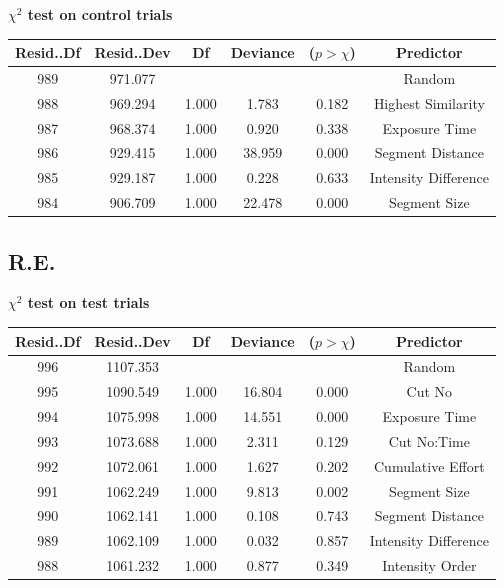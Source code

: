 \documentclass{article}
\begin{document}
\textbf{$\chi^2$ test on control trials}
\label{table:participantsAnovaMAEControl}
\begin{table}[ht]
    \centering
    \begin{tabular}{cccccc}
    \hline
    Resid..Df & Resid..Dev &    Df & Deviance & ($p > \chi$) &    Predictor \\
    \hline
        989 &    971.077 &       &          &            &   Random \\
      988 &    969.294 & 1.000 &    1.783 &      0.182 & Highest Similarity \\
      987 &    968.374 & 1.000 &    0.920 &      0.338 &          Exposure Time \\
      986 &    929.415 & 1.000 &   38.959 &      0.000 &          Segment Distance \\
      985 &    929.187 & 1.000 &    0.228 &      0.633 &         Intensity Difference \\
      984 &    906.709 & 1.000 &   22.478 &      0.000 &          Segment Size \\
    \hline
    \end{tabular}
\end{table}
\clearpage


\subsection*{R.E.}
\label{table:participantsAnovaRE}    
\textbf{$\chi^2$ test on test trials}
 
\begin{table}[ht]    
    \centering    
    \begin{tabular}{cccccc}
    \hline
    Resid..Df & Resid..Dev &    Df & Deviance & ($p > \chi$) &    Predictor \\
    \hline
      996 &   1107.353 &       &          &            &       Random \\
      995 &   1090.549 & 1.000 &   16.804 &      0.000 &       Cut No \\
      994 &   1075.998 & 1.000 &   14.551 &      0.000 &    Exposure Time \\
      993 &   1073.688 & 1.000 &    2.311 &      0.129 &  Cut No:Time \\
      992 &   1072.061 & 1.000 &    1.627 &      0.202 & Cumulative Effort \\
      991 &   1062.249 & 1.000 &    9.813 &      0.002 &    Segment Size \\
      990 &   1062.141 & 1.000 &    0.108 &      0.743 &    Segment Distance \\
      989 &   1062.109 & 1.000 &    0.032 &      0.857 &   Intensity Difference \\
      988 &   1061.232 & 1.000 &    0.877 &      0.349 &     Intensity Order \\
    \hline
    \end{tabular}    
\end{table}
\end{document}
